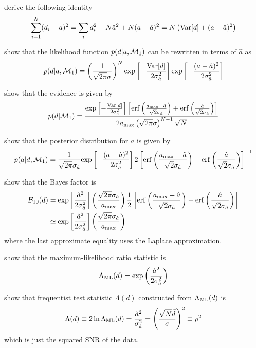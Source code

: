 \documentclass[11pt]{article}
\def\be{\begin{equation}}
\def\ee{\end{equation}}
\begin{document}
\item
derive the following identity
%
\be
\sum_{i=1}^N(d_i-a)^2 =\sum_i d_i^2 - N\hat a^2+N(a-\hat a)^2
= N\left({\rm Var}[d] + (a-\hat a)^2\right)
\ee
%

\item
show that the likelihood function $p(d|a,{\cal M}_1)$ can be
rewritten in terms of $\hat a$ as
%
\be
p(d|a,{\cal M}_1)=\left(\frac{1}{\sqrt{2\pi}\sigma}\right)^N
{\rm exp}\left[-\frac{{\rm Var}[d]}{2\sigma^2_{\hat a}}\right]
{\rm exp}\left[-\frac{(a-\hat a)^2}{2\sigma^2_{\hat a}}\right]
\ee
%

\item
show that the evidence is given by
%
\be
p(d|{\cal M}_1)=
\frac{{\rm exp}\left[-\frac{{\rm Var}[d]}{2\sigma^2_{\hat a}}\right]
\left[
{\rm erf}\left(\frac{a_{\rm max}-\hat a}{\sqrt{2}\sigma_{\hat a}}\right) +
{\rm erf}\left(\frac{\hat a}{\sqrt{2}\sigma_{\hat a}}\right) 
\right]}
{2a_{\rm max}\left(\sqrt{2\pi}\sigma\right)^{N-1}\sqrt{N}}
\ee
%

\item
show that the posterior distribution for $a$ is given by
%
\be
p(a|d,{\cal M}_1)=\frac{1}{\sqrt{2\pi}\sigma_{\hat a}}{\rm exp}\left[-\frac{(a-\hat a)^2}{2\sigma^2_{\hat a}}\right]
2\left[
{\rm erf}\left(\frac{a_{\rm max}-\hat a}{\sqrt{2}\sigma_{\hat a}}\right) +
{\rm erf}\left(\frac{\hat a}{\sqrt{2}\sigma_{\hat a}}\right) 
\right]^{-1}
\ee
%

\item
show that the Bayes factor is
%
\begin{align}
{\cal B}_{10}(d) &= {\rm exp}\left[\frac{\hat a^2}{2\sigma^2_{\hat a}}\right]
\left(\frac{\sqrt{2\pi}\sigma_{\hat a}}{a_{\rm max}}\right)
\frac{1}{2}\left[
{\rm erf}\left(\frac{a_{\rm max}-\hat a}{\sqrt{2}\sigma_{\hat a}}\right) +
{\rm erf}\left(\frac{\hat a}{\sqrt{2}\sigma_{\hat a}}\right) 
\right]
\\
&\simeq {\rm exp}\left[\frac{\hat a^2}{2\sigma^2_{\hat a}}\right]
\left(\frac{\sqrt{2\pi}\sigma_{\hat a}}{a_{\rm max}}\right)
\label{e:laplace}
\end{align}
%
where the last approximate equality uses the Laplace approximation.

\item
show that the maximum-likelihood ratio statistic is
%
\be
\Lambda_{\rm ML}(d) = {\rm exp}\left(\frac{\hat a^2}{2\sigma^2_{\hat a}}\right)
\ee
%

\item
show that frequentist test statistic $\Lambda(d)$ constructed from $\Lambda_{\rm ML}(d)$ is
%
\be
\Lambda(d) \equiv 2\ln \Lambda_{\rm ML}(d) = \frac{\hat a^2}{\sigma^2_{\hat a}} 
= \left(\frac{\sqrt{N}\bar d}{\sigma}\right)^2 \equiv \rho^2
\ee
%
which is just the squared SNR of the data.
\end{document}
